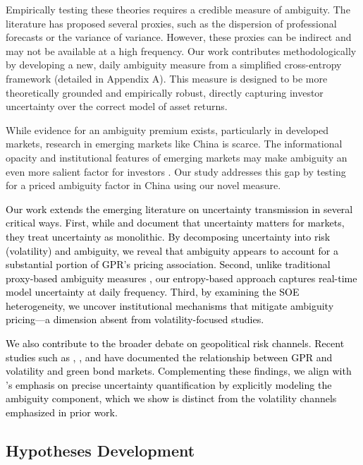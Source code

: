 \documentclass[preprint,12pt,authoryear]{elsarticle}
\begin{document}
Empirically testing these theories requires a credible measure of ambiguity. The literature has proposed several proxies, such as the dispersion of professional forecasts \citep{Brenner2018, Ulrich2013} or the variance of variance. However, these proxies can be indirect and may not be available at a high frequency. Our work contributes methodologically by developing a new, daily ambiguity measure from a simplified cross-entropy framework (detailed in Appendix A). This measure is designed to be more theoretically grounded and empirically robust, directly capturing investor uncertainty over the correct model of asset returns.

While evidence for an ambiguity premium exists, particularly in developed markets, research in emerging markets like China is scarce. The informational opacity and institutional features of emerging markets may make ambiguity an even more salient factor for investors \citep{Easley2009}. Our study addresses this gap by testing for a priced ambiguity factor in China using our novel measure.

\textcolor{black}{Our work extends the emerging literature on uncertainty transmission in several critical ways. First, while \citet{Baker2016} and \citet{Caldara2022} document that uncertainty matters for markets, they treat uncertainty as monolithic. By decomposing uncertainty into risk (volatility) and ambiguity, we reveal that ambiguity \textcolor{black}{appears to account for a substantial portion} of GPR's pricing \textcolor{black}{association}. Second, unlike traditional proxy-based ambiguity measures \citep{Brenner2018}, our entropy-based approach captures real-time model uncertainty at daily frequency. Third, by examining the SOE heterogeneity, we uncover institutional mechanisms that mitigate ambiguity pricing---a dimension absent from volatility-focused studies.}

\textcolor{black}{We also contribute to the broader debate on geopolitical risk channels. Recent studies such as \citet{Bouri2024}, \citet{Liu2024}, and \citet{Zhang2023} have documented the \textcolor{black}{relationship between} GPR \textcolor{black}{and} volatility and green bond markets. Complementing these findings, we align with \citet{Nemani2023}’s emphasis on precise uncertainty quantification by explicitly modeling the ambiguity component, which we show is distinct from the volatility channels emphasized in prior work.}

\subsection{Hypotheses Development}
\end{document}
